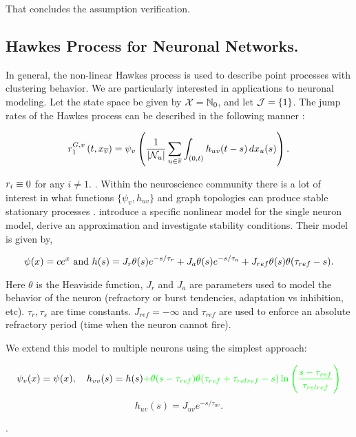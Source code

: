 That concludes the assumption verification.

\subsection{Hawkes Process for Neuronal Networks.}
\label{ex::Hawkes}

In general, the non-linear Hawkes process is used to describe point processes with clustering behavior. We are particularly interested in applications to neuronal modeling. Let the state space be given by \(\mathcal{X} = \mathbb{N}_0\), and let \(\mathcal{J} = \{1\}\). The jump rates of the Hawkes process can be described in the following manner \cite{BreMas96}:

\[\rate\stpara{1}\gvpara{G}{v}\tmepro{t}{\xf\vind{\cl{v}}}{} = \psi_v\left(\frac{1}{|\neigh{u}|}\sum_{u \in \cl{v}}\int_{(0,t)}  h_{uv}(t-s)\,d\xf\vind{u}(s)\right).\]

\(r_{i} \equiv 0\) for any \(i \neq 1\). . Within the neuroscience community there is a lot of interest in what functions \(\{\psi_v,h_{uv}\}\) and graph topologies can produce stable stationary processes . \cite{GerDegTru17} introduce a specific nonlinear model for the single neuron model, derive an approximation and investigate stability conditions. Their model is given by,

\[\psi(x) = ce^x\text{ and } h(s) = J_r\theta(s)e^{-s/\tau_r} + J_a\theta(s)e^{-s/\tau_a} + J_{ref}\theta(s)\theta(\tau_{ref}-s).\]

Here \(\theta\) is the Heaviside function, \(J_r\) and \(J_a\) are parameters used to model the behavior of the neuron (refractory or burst tendencies, adaptation vs inhibition, etc). \(\tau_r,\tau_s\) are time constants. \(J_{ref} = -\infty\) and \(\tau_{ref}\) are used to enforce an absolute refractory period (time when the neuron cannot fire).

\ind We extend this model to multiple neurons using the simplest approach:

\[\psi_v(x) = \psi(x),\quad h_{vv}(s) = h(s)\textcolor{green}{ + \theta(s-\tau_{ref})\theta(\tau_{ref}+\tau_{relref}-s)\ln\left(\frac{s-\tau_{ref}}{\tau_{relref}}\right)}\]
\[h_{uv}(s) = J_{uv}e^{-s/\tau_{uv}}.\]

 .

